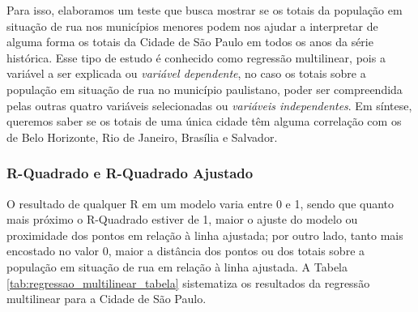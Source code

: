 \documentclass[14pt]{extarticle}
\begin{document}
Para isso, elaboramos um teste que busca mostrar se os totais da população em situação de rua nos municípios menores podem nos ajudar a interpretar de alguma forma os totais da Cidade de São Paulo em todos os anos da série histórica. Esse tipo de estudo é conhecido como regressão multilinear, pois a variável a ser explicada ou \emph{variável dependente}, no caso os totais sobre a população em situação de rua no município paulistano, poder ser compreendida pelas outras quatro variáveis selecionadas ou \emph{variáveis independentes}. Em síntese, queremos saber se os totais de uma única cidade têm alguma correlação com os de Belo Horizonte, Rio de Janeiro, Brasília e Salvador.\\ 

\subsubsection{R-Quadrado e R-Quadrado Ajustado}
\label{r_quadrado_r_ajustado}

O resultado de qualquer R em um modelo varia entre 0 e 1, sendo que quanto mais próximo o R-Quadrado estiver de 1, maior o ajuste do modelo ou proximidade dos pontos em relação à linha ajustada; por outro lado, tanto mais encostado no valor 0, maior a distância dos pontos ou dos totais sobre a população em situação de rua em relação à linha ajustada. A Tabela \ref{tab:regressao_multilinear_tabela} sistematiza os resultados da regressão multilinear para a Cidade de São Paulo.
\end{document}

